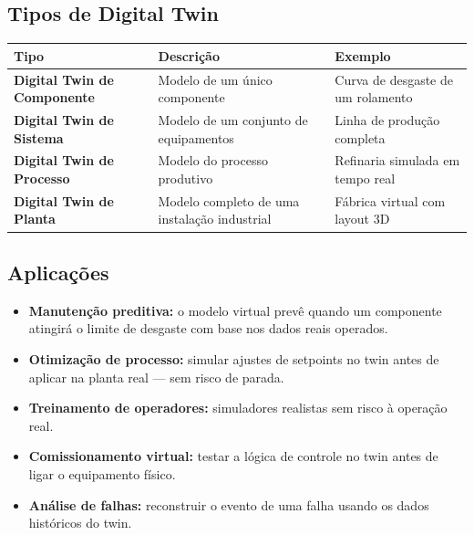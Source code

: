 \subsection{Tipos de Digital Twin}\label{tipos-de-digital-twin}

\begin{longtable}[]{@{}
  >{\raggedright\arraybackslash}p{}
  >{\raggedright\arraybackslash}p{}
  >{\raggedright\arraybackslash}p{}@{}}
\toprule\noalign{}
\begin{minipage}[b]{\linewidth}\raggedright
Tipo
\end{minipage} & \begin{minipage}[b]{\linewidth}\raggedright
Descrição
\end{minipage} & \begin{minipage}[b]{\linewidth}\raggedright
Exemplo
\end{minipage} \\
\midrule\noalign{}
\endhead
\bottomrule\noalign{}
\endlastfoot
\textbf{Digital Twin de Componente} & Modelo de um único componente & Curva de desgaste de um rolamento \\
\textbf{Digital Twin de Sistema} & Modelo de um conjunto de equipamentos & Linha de produção completa \\
\textbf{Digital Twin de Processo} & Modelo do processo produtivo & Refinaria simulada em tempo real \\
\textbf{Digital Twin de Planta} & Modelo completo de uma instalação industrial & Fábrica virtual com layout 3D \\
\end{longtable}

\subsection{Aplicações}\label{aplicauxe7uxf5es}

\begin{itemize}
\tightlist
\item
  \textbf{Manutenção preditiva:} o modelo virtual prevê quando um componente atingirá o limite de desgaste com base nos dados reais operados.
\item
  \textbf{Otimização de processo:} simular ajustes de setpoints no twin antes de aplicar na planta real --- sem risco de parada.
\item
  \textbf{Treinamento de operadores:} simuladores realistas sem risco à operação real.
\item
  \textbf{Comissionamento virtual:} testar a lógica de controle no twin antes de ligar o equipamento físico.
\item
  \textbf{Análise de falhas:} reconstruir o evento de uma falha usando os dados históricos do twin.
\end{itemize}

